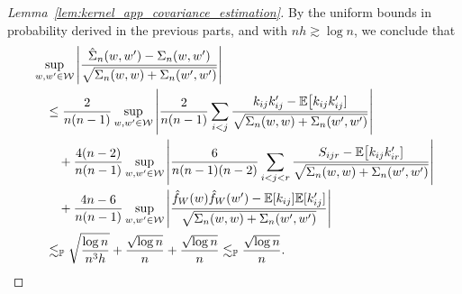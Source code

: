 \begin{proof}[Lemma~\ref{lem:kernel_app_covariance_estimation}]
  By the uniform bounds in probability
  derived in the previous parts,
  and with $n h \gtrsim \log n$,
  we conclude that
  \begin{align*}
    &\sup_{w,w' \in \mathcal{W}}
    \left|
    \frac{\hat \Sigma_n(w,w') - \Sigma_n(w,w')}
    {\sqrt{\Sigma_n(w,w) + \Sigma_n(w',w')}}
    \right| \\
    &\quad\leq
    \frac{2}{n(n-1)}
    \sup_{w,w' \in \mathcal{W}}
    \left|
    \frac{2}{n(n-1)}
    \sum_{i<j}
    \frac{k_{i j} k_{i j}' - \mathbb{E}\big[k_{i j} k_{i j}']}
    {\sqrt{\Sigma_n(w,w) + \Sigma_n(w',w')}}
    \right| \\
    &\qquad+
    \frac{4(n-2)}{n(n-1)}
    \sup_{w,w' \in \mathcal{W}}
    \left|
    \frac{6}{n(n-1)(n-2)}
    \sum_{i<j<r}
    \frac{S_{i j r} - \mathbb{E}\big[k_{i j} k_{i r}']}
    {\sqrt{\Sigma_n(w,w) + \Sigma_n(w',w')}}
    \right| \\
    &\qquad+
    \frac{4n-6}{n(n-1)}
    \sup_{w,w' \in \mathcal{W}}
    \left|
    \frac{\hat f_W(w) \hat f_W(w') - \mathbb{E}[k_{i j}] \mathbb{E}[k_{i j}']}
    {\sqrt{\Sigma_n(w,w) + \Sigma_n(w',w')}}
    \right| \\
    &\quad\lesssim_{\mathbb{P}}
    \sqrt{\frac{\log n}{n^3h}}
    + \frac{\sqrt{\log n}}{n}
    + \frac{\sqrt{\log n}}{n}
    \lesssim_{\mathbb{P}}
    \frac{\sqrt{\log n}}{n}.
  \end{align*}
\end{proof}

